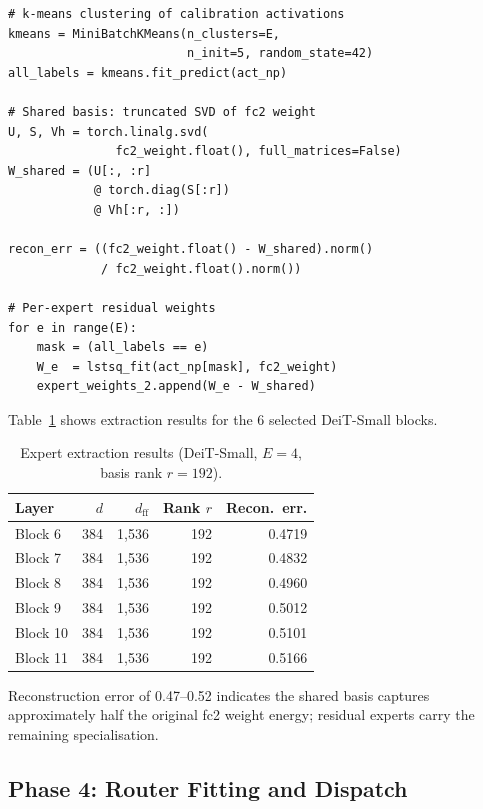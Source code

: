 \documentclass[conference]{IEEEtran}
\begin{document}
\begin{lstlisting}[caption={Core SVD decomposition and residual extraction
(\texttt{clear\_moe/extraction.py}).},label={lst:extract}]
# k-means clustering of calibration activations
kmeans = MiniBatchKMeans(n_clusters=E,
                         n_init=5, random_state=42)
all_labels = kmeans.fit_predict(act_np)

# Shared basis: truncated SVD of fc2 weight
U, S, Vh = torch.linalg.svd(
               fc2_weight.float(), full_matrices=False)
W_shared = (U[:, :r]
            @ torch.diag(S[:r])
            @ Vh[:r, :])

recon_err = ((fc2_weight.float() - W_shared).norm()
             / fc2_weight.float().norm())

# Per-expert residual weights
for e in range(E):
    mask = (all_labels == e)
    W_e  = lstsq_fit(act_np[mask], fc2_weight)
    expert_weights_2.append(W_e - W_shared)
\end{lstlisting}

Table~\ref{tab:extraction} shows extraction results for the 6 selected
DeiT-Small blocks.

\begin{table}[htbp]
\caption{Expert extraction results (DeiT-Small, $E{=}4$, basis rank $r{=}192$).}
\label{tab:extraction}
\centering
\scriptsize
\begin{tabular}{lrrrr}
\toprule
\textbf{Layer} & \textbf{$d$} & \textbf{$d_\text{ff}$} & \textbf{Rank $r$} & \textbf{Recon.\ err.} \\
\midrule
Block 6  & 384 & 1,536 & 192 & 0.4719 \\
Block 7  & 384 & 1,536 & 192 & 0.4832 \\
Block 8  & 384 & 1,536 & 192 & 0.4960 \\
Block 9  & 384 & 1,536 & 192 & 0.5012 \\
Block 10 & 384 & 1,536 & 192 & 0.5101 \\
Block 11 & 384 & 1,536 & 192 & 0.5166 \\
\bottomrule
\end{tabular}
\end{table}

Reconstruction error of 0.47--0.52 indicates the shared basis captures
approximately half the original fc2 weight energy; residual experts carry
the remaining specialisation.

\subsection{Phase 4: Router Fitting and Dispatch}
\end{document}
